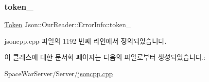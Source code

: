\subsubsection{\texorpdfstring{token\+\_\+}{token\_}}
{\footnotesize\ttfamily \hyperlink{class_json_1_1_our_reader_1_1_token}{Token} Json\+::\+Our\+Reader\+::\+Error\+Info\+::token\+\_\+}



jsoncpp.\+cpp 파일의 1192 번째 라인에서 정의되었습니다.



이 클래스에 대한 문서화 페이지는 다음의 파일로부터 생성되었습니다.\+:\begin{DoxyCompactItemize}
\item 
Space\+War\+Server/\+Server/\hyperlink{jsoncpp_8cpp}{jsoncpp.\+cpp}\end{DoxyCompactItemize}
